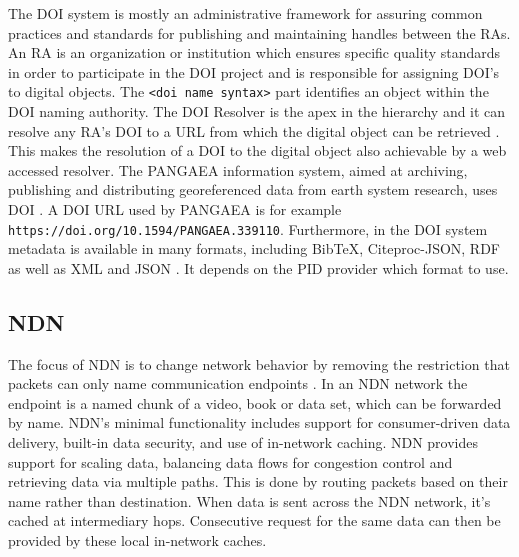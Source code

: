 The DOI system is mostly an administrative framework for assuring common practices and standards for publishing and maintaining handles between the RAs. An RA is an organization or institution which ensures specific quality standards in order to participate in the DOI project and is responsible for assigning DOI's to digital objects. The \texttt{<doi name syntax>} part identifies an object within the DOI naming authority. The DOI Resolver is the apex in the hierarchy and it can resolve any RA's DOI to a URL from which the digital object can be retrieved \cite{icn-bd}. This makes the resolution of a DOI to the digital object also achievable by a web accessed resolver. The PANGAEA information system, aimed at archiving, publishing and distributing georeferenced data from earth system research, uses DOI \cite{pang}. A DOI URL used by PANGAEA is for example \texttt{https://doi.org/10.1594/PANGAEA.339110}.
Furthermore, in the DOI system metadata is available in many formats, including BibTeX, Citeproc-JSON, RDF as well as XML and JSON \cite{doi-met}. It depends on the PID provider which format to use.

\subsection{NDN}
\label{overview-ndn}
The focus of NDN is to change network behavior by removing the restriction that packets can only name communication endpoints \cite{ndn-summary}. In an NDN network the endpoint is a named chunk of a video, book or data set, which can be forwarded by name. NDN’s minimal functionality includes support for consumer-driven data delivery, built-in data security, and use of in-network caching. NDN provides support for scaling data, balancing data flows for congestion control and retrieving data via multiple paths. This is done by routing packets based on their name rather than destination. When data is sent across the NDN network, it's cached at intermediary hops. Consecutive request for the same data can then be provided by these local in-network caches.

